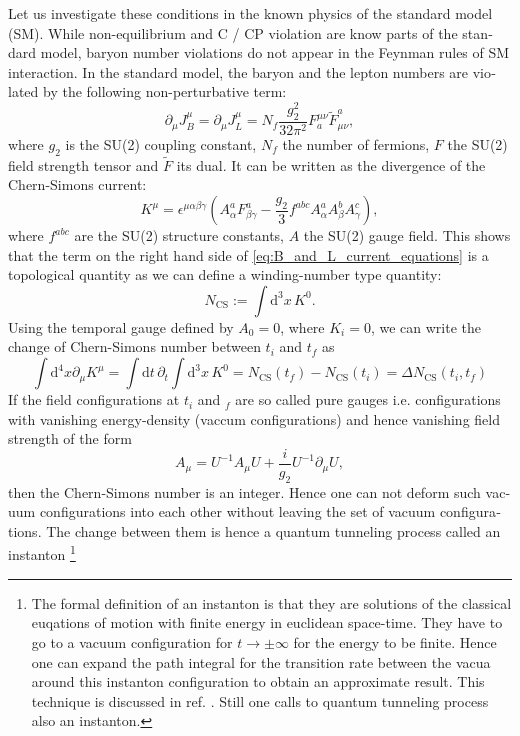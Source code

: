 \documentclass[master,       %
               twoside,        %
               BCOR10mm,       %
               english,ngerman, %
               ]{GAUBM}
\begin{document}
\begin{otherlanguage}{english}
Let us investigate these conditions in the known physics of the standard model (SM). While non-equilibrium and C / CP violation are know parts of the standard model, baryon number violations do not appear in the Feynman rules of SM interaction. In the standard model, the baryon and the lepton numbers are violated by the following non-perturbative term:
\begin{equation}
	\label{eq:B_and_L_current_equations}
	\partial_\mu J^\mu_B = \partial_\mu J^\mu_L = N_f \frac{g_2^2}{32 \pi^2} F^{\mu \nu}_a \tilde{F}_{\mu \nu}^a,
\end{equation}
where $g_2$ is the SU(2) coupling constant, $N_f$ the number of fermions, $F$ the SU(2) field strength tensor and $\tilde{F}$ its dual.
It can be written as the divergence of the Chern-Simons current:
\begin{equation}
	\label{eq:chern_simons_current}
	K^\mu = \epsilon^{\mu \alpha \beta \gamma} \left( A^a_\alpha F^a_{\beta \gamma} - \frac{g_2}{3} f^{abc} A^a_\alpha A^b_\beta A^c_\gamma \right),
\end{equation}
where $f^{abc}$ are the SU(2) structure constants, $A$ the SU(2) gauge field.
This shows that the term on the right hand side of \eqref{eq:B_and_L_current_equations} is a topological quantity as we can define a winding-number type quantity:
\begin{equation}
	N_{\mathrm{CS}} := \int \mathrm{d}^3 x \, K^0.
\end{equation}
Using the temporal gauge defined by $A_0 = 0$, where $K_i = 0$,
we can write the change of Chern-Simons number between $t_i$ and $t_f$ as
\begin{equation}
	\int \mathrm{d}^4 x \partial_\mu K^\mu = \int \mathrm{d} t \, \partial_t \int \mathrm{d}^3 x \, K^0 =
	N_{\mathrm{CS}}(t_f) - N_{\mathrm{CS}}(t_i) = \Delta N_{\mathrm{CS}}(t_i, t_f)
\end{equation}
If the field configurations at $t_i$ and $_f$ are so called pure gauges i.e. configurations with vanishing energy-density (vaccum configurations) and hence vanishing field strength of the form
\begin{equation}
	A_\mu = U^{-1} A_\mu U + \frac{i}{g_2} U^{-1} \partial_\mu U,
\end{equation}
then the Chern-Simons number is an integer.
Hence one can not deform such vacuum configurations into each other without leaving the set of vacuum configurations.
The change between them is hence a quantum tunneling process called an instanton \footnote{
The formal definition of an instanton is that they are solutions of the classical euqations of motion with finite energy in euclidean space-time. They have to go to a vacuum configuration for $t \to \pm \infty$ for the energy to be finite. Hence one can expand the path integral for the transition rate between the vacua around this instanton configuration to obtain an approximate result. This technique is discussed in ref. \cite[chap. 7]{aspects_of_symmmetry}. Still one calls to quantum tunneling process also an instanton.
}
\end{otherlanguage}
\end{document}
